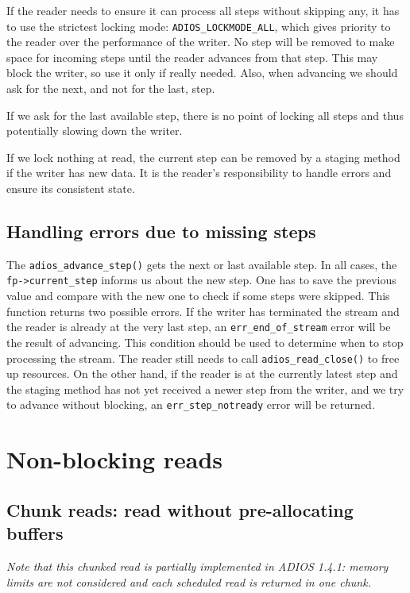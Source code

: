 If the reader needs to ensure it can process all steps without skipping any, it has to use the strictest locking mode: \verb+ADIOS_LOCKMODE_ALL+, which gives priority to the reader over the performance of the writer. No step will be removed to make space for incoming steps until the reader advances from that step. This may block the writer, so use it only if really needed. Also, when advancing we should ask for the next, and not for the last, step. 

If we ask for the last available step, there is no point of locking all steps and thus potentially slowing down the writer. 

If we lock nothing at read, the current step can be removed by a staging method if the writer has new data. It is the reader's responsibility to handle errors and ensure its consistent state. 

\subsection{Handling errors due to missing steps}
The \verb+adios_advance_step()+ gets the next or last available step. In all cases, the \verb+fp->current_step+ informs us about the new step. One has to save the previous value and compare with the new one to check if some steps were skipped. This function returns two possible errors. If the writer has terminated the stream and the reader is already at the very last step, an \verb+err_end_of_stream+ error will be the result of advancing. This condition should be used to determine when to stop processing the stream. The reader still needs to call \verb+adios_read_close()+ to free up resources. On the other hand, if the reader is at the currently latest step and the staging method has not yet received a newer step from the writer, and we try to advance without blocking, an \verb+err_step_notready+ error will be returned.  




\section{Non-blocking reads}

\subsection{Chunk reads: read without pre-allocating buffers}
\emph{Note that this chunked read is partially implemented in ADIOS 1.4.1: memory limits are not considered and each scheduled read is returned in one chunk.}

